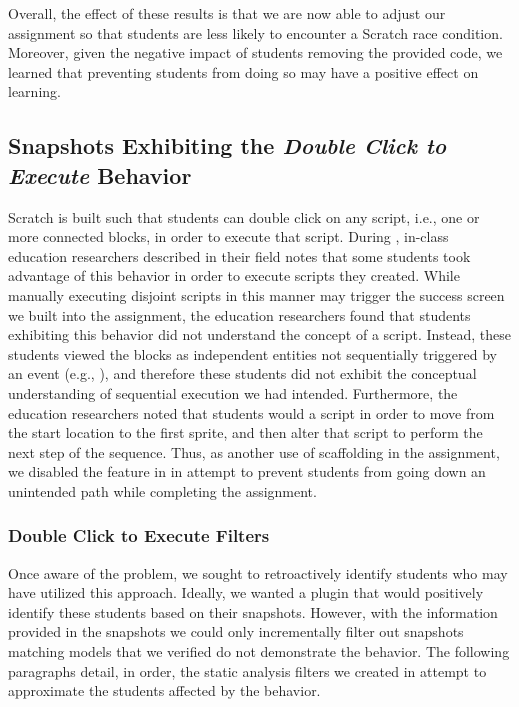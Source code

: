 Overall, the effect of these results is that we are now able to adjust our
assignment so that students are less likely to encounter a Scratch race
condition. Moreover, given the negative impact of students removing the
provided code, we learned that preventing students from doing so may have a
positive effect on learning.

\subsection{Snapshots Exhibiting the \emph{Double Click to Execute} Behavior}

Scratch is built such that students can double click on any script, i.e., one
or more connected blocks, in order to execute that script. During \sone{},
in-class education researchers described in their field notes that some
students took advantage of this behavior in order to execute scripts they
created. While manually executing disjoint scripts in this manner may trigger
the success screen we built into the assignment, the education researchers
found that students exhibiting this behavior did not understand the concept of
a script. Instead, these students viewed the blocks as independent entities not
sequentially triggered by an event (e.g., \netclicked{}), and therefore these
students did not exhibit the conceptual understanding of sequential execution
we had intended. Furthermore, the education researchers noted that students
would \dce{} a script in order to move from the start location to the first
sprite, and then alter that script to perform the next step of the
sequence. Thus, as another use of scaffolding in the assignment, we disabled
the \dce{} feature in \stwo{} in attempt to prevent students from going down an
unintended path while completing the assignment.

\subsubsection{Double Click to Execute Filters}
Once aware of the problem, we sought to retroactively identify students who may
have utilized this \dce{} approach. Ideally, we wanted a plugin that would
positively identify these students based on their snapshots. However, with the
information provided in the snapshots we could only incrementally filter out
snapshots matching models that we verified do not demonstrate the \dce{}
behavior. The following paragraphs detail, in order, the static analysis
filters we created in attempt to approximate the students affected by the
\dce{} behavior.

